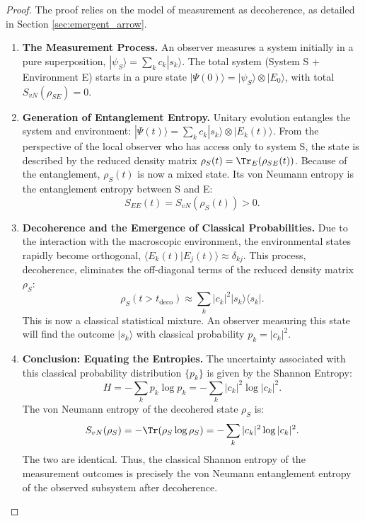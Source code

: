 \documentclass[11pt, letterpaper]{report}
\theoremstyle{plain} %
\theoremstyle{definition} %
\theoremstyle{remark} %
\begin{document}
\begin{proof}
The proof relies on the model of measurement as decoherence, as detailed in Section \ref{sec:emergent_arrow}.
\begin{enumerate}
    \item \textbf{The Measurement Process.} An observer measures a system initially in a pure superposition, $|\psi_S\rangle = \sum_k c_k |s_k\rangle$. The total system (System S + Environment E) starts in a pure state $|\Psi(0)\rangle = |\psi_S\rangle \otimes |E_0\rangle$, with total $S_{vN}(\rho_{SE})=0$.

    \item \textbf{Generation of Entanglement Entropy.} Unitary evolution entangles the system and environment: $|\Psi(t)\rangle = \sum_k c_k |s_k\rangle \otimes |E_k(t)\rangle$. From the perspective of the local observer who has access only to system S, the state is described by the reduced density matrix $\rho_S(t) = \Tr_E(\rho_{SE}(t))$. Because of the entanglement, $\rho_S(t)$ is now a mixed state. Its von Neumann entropy is the entanglement entropy between S and E:
    \begin{equation}
        S_{EE}(t) = S_{vN}(\rho_S(t)) > 0.
    \end{equation}

    \item \textbf{Decoherence and the Emergence of Classical Probabilities.} Due to the interaction with the macroscopic environment, the environmental states rapidly become orthogonal, $\langle E_k(t)|E_j(t)\rangle \approx \delta_{kj}$. This process, decoherence, eliminates the off-diagonal terms of the reduced density matrix $\rho_S$:
    \begin{equation}
        \rho_S(t > t_{\text{deco}}) \approx \sum_k |c_k|^2 |s_k\rangle\langle s_k|.
    \end{equation}
    This is now a classical statistical mixture. An observer measuring this state will find the outcome $|s_k\rangle$ with classical probability $p_k = |c_k|^2$.

    \item \textbf{Conclusion: Equating the Entropies.} The uncertainty associated with this classical probability distribution $\{p_k\}$ is given by the Shannon Entropy:
    \begin{equation}
        H = -\sum_k p_k \log p_k = -\sum_k |c_k|^2 \log |c_k|^2.
    \end{equation}
    The von Neumann entropy of the decohered state $\rho_S$ is:
    \begin{equation}
        S_{vN}(\rho_S) = -\Tr(\rho_S \log\rho_S) = -\sum_k |c_k|^2 \log |c_k|^2.
    \end{equation}
    The two are identical. Thus, the classical Shannon entropy of the measurement outcomes is precisely the von Neumann entanglement entropy of the observed subsystem after decoherence.
\end{enumerate}
\end{proof}
\end{document}
